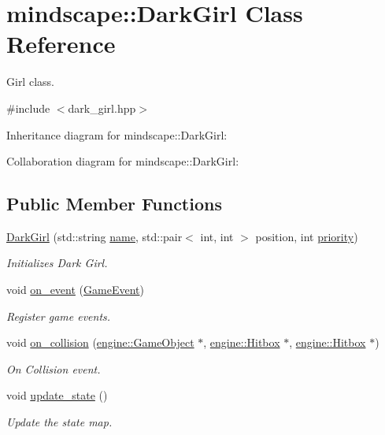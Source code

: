 \hypertarget{classmindscape_1_1_dark_girl}{}\section{mindscape\+:\+:Dark\+Girl Class Reference}
\label{classmindscape_1_1_dark_girl}


Girl class.  




{\ttfamily \#include $<$dark\+\_\+girl.\+hpp$>$}



Inheritance diagram for mindscape\+:\+:Dark\+Girl\+:


Collaboration diagram for mindscape\+:\+:Dark\+Girl\+:
\subsection*{Public Member Functions}
\begin{DoxyCompactItemize}
\item 
\hyperlink{classmindscape_1_1_dark_girl_a8706a5025f46ae898987f25f775917b3}{Dark\+Girl} (std\+::string \hyperlink{classengine_1_1_game_object_a1f104f7af4f351e6d3278319762c9fe5}{name}, std\+::pair$<$ int, int $>$ position, int \hyperlink{classengine_1_1_game_object_a159ecaca30229e302793b11a75bd13c2}{priority})
\begin{DoxyCompactList}\small\item\em Initializes Dark Girl. \end{DoxyCompactList}\item 
void \hyperlink{classmindscape_1_1_dark_girl_ae9c166c0c5eb205a7e47ce5244d37ab0}{on\+\_\+event} (\hyperlink{class_game_event}{Game\+Event})
\begin{DoxyCompactList}\small\item\em Register game events. \end{DoxyCompactList}\item 
void \hyperlink{classmindscape_1_1_dark_girl_a594b92edd6c401bb890ef5972fe15390}{on\+\_\+collision} (\hyperlink{classengine_1_1_game_object}{engine\+::\+Game\+Object} $\ast$, \hyperlink{classengine_1_1_hitbox}{engine\+::\+Hitbox} $\ast$, \hyperlink{classengine_1_1_hitbox}{engine\+::\+Hitbox} $\ast$)
\begin{DoxyCompactList}\small\item\em On Collision event. \end{DoxyCompactList}\item 
void \hyperlink{classmindscape_1_1_dark_girl_a8575c2baaa6c883f76224b84847d1f2a}{update\+\_\+state} ()
\begin{DoxyCompactList}\small\item\em Update the state map. \end{DoxyCompactList}\end{DoxyCompactItemize}
